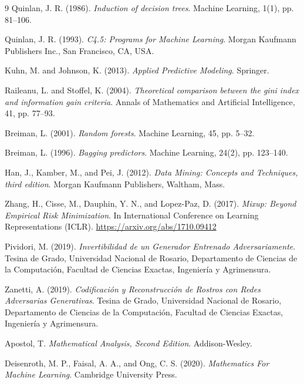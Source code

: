 \begin{thebibliography}{9}
Quinlan, J. R. (1986).
\textit{Induction of decision trees}.
Machine Learning, 1(1), pp. 81–106.

Quinlan, J. R. (1993).
\textit{C4.5: Programs for Machine Learning}.
Morgan Kaufmann Publishers Inc., San Francisco, CA, USA.

Kuhn, M. and Johnson, K. (2013).
\textit{Applied Predictive Modeling}.
Springer.

Raileanu, L. and Stoffel, K. (2004).
\textit{Theoretical comparison between the gini index and information gain criteria}.
Annals of Mathematics and Artificial Intelligence, 41, pp. 77–93.

Breiman, L. (2001).
\textit{Random forests}.
Machine Learning, 45, pp. 5–32.

Breiman, L. (1996).
\textit{Bagging predictors}.
Machine Learning, 24(2), pp. 123–140.

Han, J., Kamber, M., and Pei, J. (2012).
\textit{Data Mining: Concepts and Techniques, third edition}.
Morgan Kaufmann Publishers, Waltham, Mass.

Zhang, H., Cisse, M., Dauphin, Y. N., and Lopez-Paz, D. (2017).
\textit{Mixup: Beyond Empirical Risk Minimization}.
In International Conference on Learning Representations (ICLR).
\url{https://arxiv.org/abs/1710.09412}

Pividori, M. (2019).
\textit{Invertibilidad de un Generador Entrenado Adversariamente}.
Tesina de Grado, Universidad Nacional de Rosario, Departamento de Ciencias de la Computación, Facultad de Ciencias Exactas, Ingeniería y Agrimensura.

Zanetti, A. (2019).
\textit{Codificación y Reconstrucción de Rostros con Redes Adversarias Generativas}.
Tesina de Grado, Universidad Nacional de Rosario, Departamento de Ciencias de la Computación, Facultad de Ciencias Exactas, Ingeniería y Agrimensura.

Apostol, T.
\textit{Mathematical Analysis, Second Edition}.
Addison-Wesley.

Deisenroth, M. P., Faisal, A. A., and Ong, C. S. (2020).
\textit{Mathematics For Machine Learning}.
Cambridge University Press.


\end{thebibliography}
